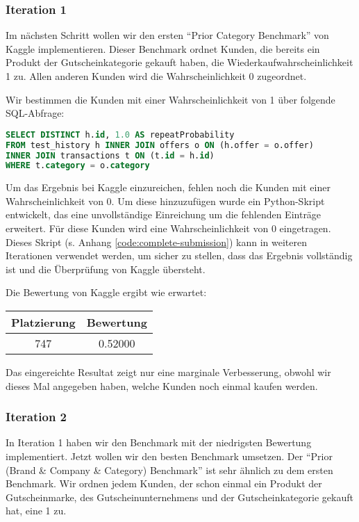 \subsubsection{Iteration 1}

Im nächsten Schritt wollen wir den ersten "`Prior Category Benchmark"' von Kaggle implementieren.
Dieser Benchmark ordnet Kunden, die bereits ein Produkt der Gutscheinkategorie gekauft haben, die
Wiederkaufwahrscheinlichkeit 1 zu. Allen anderen Kunden wird die Wahrscheinlichkeit 0 zugeordnet.

Wir bestimmen die Kunden mit einer Wahrscheinlichkeit von 1 über folgende SQL-Abfrage:
\begin{lstlisting}[language=SQL]
SELECT DISTINCT h.id, 1.0 AS repeatProbability
FROM test_history h INNER JOIN offers o ON (h.offer = o.offer)
INNER JOIN transactions t ON (t.id = h.id)
WHERE t.category = o.category
\end{lstlisting}

Um das Ergebnis bei Kaggle einzureichen, fehlen noch die Kunden mit einer Wahrscheinlichkeit von 0.
Um diese hinzuzufügen wurde ein Python-Skript entwickelt, das eine unvollständige Einreichung
um die fehlenden Einträge erweitert. Für diese Kunden wird eine Wahrscheinlichkeit von 0 eingetragen.
Dieses Skript (s. Anhang \ref{code:complete-submission}) kann in weiteren Iterationen verwendet werden,
um sicher zu stellen, dass das Ergebnis vollständig ist und die Überprüfung von Kaggle übersteht. 

Die Bewertung von Kaggle ergibt wie erwartet:

\begin{tabular}{|c|c|}
	\hline \textbf{Platzierung} & \textbf{Bewertung} \\ 
	\hline 747 & 0.52000  \\ 
	\hline 
\end{tabular}

Das eingereichte Resultat zeigt nur eine marginale Verbesserung, obwohl wir dieses Mal angegeben haben, welche Kunden noch einmal kaufen werden.

\subsubsection{Iteration 2}

In Iteration 1 haben wir den Benchmark mit der niedrigsten Bewertung implementiert. Jetzt wollen wir 
den besten Benchmark umsetzen. Der "`Prior (Brand \& Company \& Category) Benchmark"' ist sehr ähnlich
zu dem ersten Benchmark. Wir ordnen jedem Kunden, der schon einmal ein Produkt der Gutscheinmarke,
des Gutscheinunternehmens und der Gutscheinkategorie gekauft hat, eine 1 zu. 


